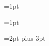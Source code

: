 \documentclass{article}
\begin{document}
=1pt\the{} \the{}

=1pt\the{}\the{}

=2pt plus 3pt 
\the{}
\end{document}
